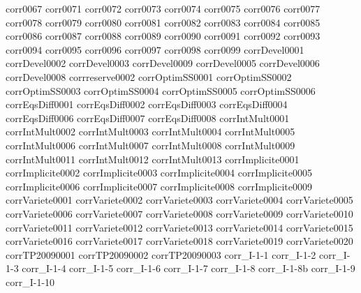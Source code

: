{corr0067}
{corr0071}
{corr0072}
{corr0073}
{corr0074}
{corr0075}
{corr0076}
{corr0077}
{corr0078}
{corr0079}
{corr0080}
{corr0081}
{corr0082}
{corr0083}
{corr0084}
{corr0085}
{corr0086}
{corr0087}
{corr0088}
{corr0089}
{corr0090}
{corr0091}
{corr0092}
{corr0093}
{corr0094}
{corr0095}
{corr0096}
{corr0097}
{corr0098}
{corr0099}
{corrDevel0001}
{corrDevel0002}
{corrDevel0003}
{corrDevel0009}
{corrDevel0005}
{corrDevel0006}
{corrDevel0008}
{corrreserve0002}
{corrOptimSS0001}
{corrOptimSS0002}
{corrOptimSS0003}
{corrOptimSS0004}
{corrOptimSS0005}
{corrOptimSS0006}
{corrEqsDiff0001}
{corrEqsDiff0002}
{corrEqsDiff0003}
{corrEqsDiff0004}
{corrEqsDiff0006}
{corrEqsDiff0007}
{corrEqsDiff0008}
{corrIntMult0001}
{corrIntMult0002}
{corrIntMult0003}
{corrIntMult0004}
{corrIntMult0005}
{corrIntMult0006}
{corrIntMult0007}
{corrIntMult0008}
{corrIntMult0009}
{corrIntMult0011}
{corrIntMult0012}
{corrIntMult0013}
{corrImplicite0001}
{corrImplicite0002}
{corrImplicite0003}
{corrImplicite0004}
{corrImplicite0005}
{corrImplicite0006}
{corrImplicite0007}
{corrImplicite0008}
{corrImplicite0009}
{corrVariete0001}
{corrVariete0002}
{corrVariete0003}
{corrVariete0004}
{corrVariete0005}
{corrVariete0006}
{corrVariete0007}
{corrVariete0008}
{corrVariete0009}
{corrVariete0010}
{corrVariete0011}
{corrVariete0012}
{corrVariete0013}
{corrVariete0014}
{corrVariete0015}
{corrVariete0016}
{corrVariete0017}
{corrVariete0018}
{corrVariete0019}
{corrVariete0020}
{corrTP20090001}
{corrTP20090002}
{corrTP20090003}
{corr_I-1-1}
{corr_I-1-2}
{corr_I-1-3}
{corr_I-1-4}
{corr_I-1-5}
{corr_I-1-6}
{corr_I-1-7}
{corr_I-1-8}
{corr_I-1-8b}
{corr_I-1-9}
{corr_I-1-10}
